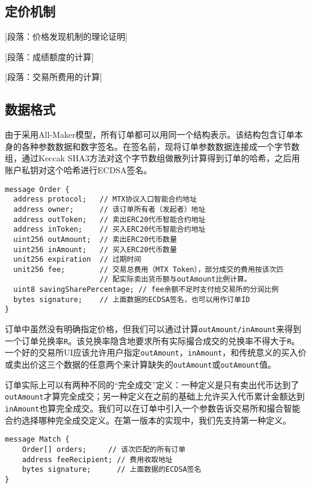 \documentclass[UTF8,nofonts]{ctexart}
\begin{document}
\subsection{定价机制\label{sec:pricediscovery}}

[段落：价格发现机制的理论证明]

[段落：成绩额度的计算]

[段落：交易所费用的计算]

\subsection{数据格式\label{sec:dataformat}}

由于采用All-Maker模型，所有订单都可以用同一个结构表示。该结构包含订单本身的各种参数数据和数字签名。在签名前，现将订单参数数据连接成一个字节数组，通过Keccak SHA3方法对这个字节数组做散列计算得到订单的哈希，之后用账户私钥对这个哈希进行ECDSA签名。


\begin{verbatim}
message Order {
  address protocol;   // MTX协议入口智能合约地址
  address owner;      // 该订单所有者（发起者）地址
  address outToken;   // 卖出ERC20代币智能合约地址
  address inToken;    // 买入ERC20代币智能合约地址
  uint256 outAmount;  // 卖出ERC20代币数量
  uint256 inAmount;   // 买入ERC20代币数量
  unit256 expiration  // 过期时间
  unit256 fee;        // 交易总费用（MTX Token），部分成交的费用按该次匹
                      // 配实际卖出货币额与outAmount比例计算。
  uint8 savingSharePercentage; // fee余额不足时支付给交易所的分润比例
  bytes signature;    // 上面数据的ECDSA签名，也可以用作订单ID
}	
\end{verbatim}

订单中虽然没有明确指定价格，但我们可以通过计算\verb|outAmount/inAmount|来得到一个订单兑换率\verb|R|。该兑换率隐含地要求所有实际撮合成交的兑换率不得大于\verb|R|。一个好的交易所UI应该允许用户指定\verb|outAmount|，\verb|inAmount|，和传统意义的买入价或卖出价这三个数据的任意两个来计算缺失的\verb|outAmount|或\verb|outAmount|值。

订单实际上可以有两种不同的“完全成交”定义：一种定义是只有卖出代币达到了\verb|outAmount|才算完全成交；另一种定义在之前的基础上允许买入代币累计金额达到\verb|inAmount|也算完全成交。我们可以在订单中引入一个参数告诉交易所和撮合智能合约选择哪种完全成交定义。在第一版本的实现中，我们先支持第一种定义。

\begin{verbatim}
message Match {
    Order[] orders;     // 该次匹配的所有订单
    address feeRecipient; // 费用收取地址
    bytes signature;      // 上面数据的ECDSA签名
}
\end{verbatim}
\end{document}
